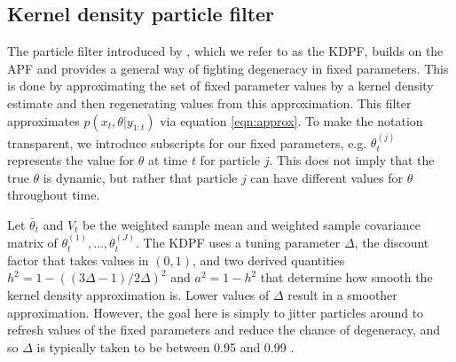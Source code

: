 \subsection{Kernel density particle filter \label{sec:kd}}

The particle filter introduced by \citet{Liu:West:comb:2001}, which we refer to as the KDPF, builds on the APF and provides a general way of fighting degeneracy in fixed parameters. This is done by approximating the set of fixed parameter values by a kernel density estimate and then regenerating values from this approximation. This filter approximates $p(x_t,\theta| y_{1:t})$ via equation \eqref{eqn:approx}. To make the notation transparent, we introduce subscripts for our fixed parameters, e.g. $\theta_t^{(j)}$ represents the value for $\theta$ at time $t$ for particle $j$. This does not imply that the true $\theta$ is dynamic, but rather that particle $j$ can have different values for $\theta$ throughout time.

Let $\bar{\theta}_t$ and $V_t$ be the weighted sample mean and weighted sample covariance matrix of $\theta_t^{(1)},\ldots,\theta_t^{(J)}$.  The KDPF uses a tuning parameter $\Delta$, the discount factor that takes values in $(0,1)$, and two derived quantities $h^2 = 1 - ((3\Delta - 1)/2\Delta)^2$ and $a^2 = 1 - h^2$ that determine how smooth the kernel density approximation is. Lower values of $\Delta$ result in a smoother approximation. However, the goal here is simply to jitter particles around to refresh values of the fixed parameters and reduce the chance of degeneracy, and so $\Delta$ is typically taken to be between 0.95 and 0.99 \citep{Liu:West:comb:2001}.

